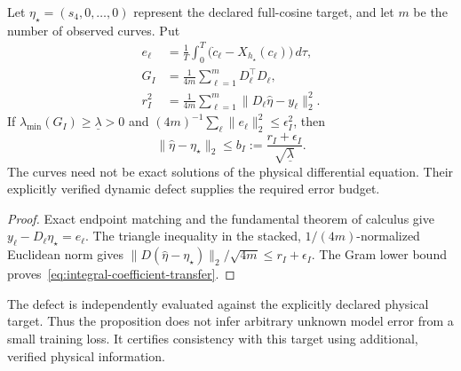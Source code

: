 \begin{proposition}
\label{prop:integral-transfer}
Let $\eta_\star=(s_4,0,\ldots,0)$ represent the declared full-cosine target,
and let $m$ be the number of observed curves. Put
\begin{equation}
 \begin{aligned}
 e_\ell&=\frac1T\int_0^T
       \bigl(\dot c_\ell-X_{h_\star}(c_\ell)\bigr)\,d\tau,\\
 G_I&=\frac1{4m}\sum_{\ell=1}^m D_\ell^\top D_\ell,\\
 r_I^2&=\frac1{4m}\sum_{\ell=1}^m
                   \|D_\ell\widehat\eta-y_\ell\|_2^2 .
 \end{aligned}
 \label{eq:integral-defect-gram}
\end{equation}
If $\lambda_{\min}(G_I)\geq\underline\lambda>0$ and
$(4m)^{-1}\sum_\ell\|e_\ell\|_2^2\leq\epsilon_I^2$, then
\begin{equation}
 \|\widehat\eta-\eta_\star\|_2
 \leq b_I:=\frac{r_I+\epsilon_I}{\sqrt{\underline\lambda}} .
 \label{eq:integral-coefficient-transfer}
\end{equation}
The curves need not be exact solutions of the physical differential
equation. Their explicitly verified dynamic defect supplies the required
error budget.
\end{proposition}

\begin{proof}
Exact endpoint matching and the fundamental theorem of calculus give
$y_\ell-D_\ell\eta_\star=e_\ell$.
The triangle inequality in the stacked, $1/(4m)$-normalized Euclidean
norm gives
$\|D(\widehat\eta-\eta_\star)\|_2/\sqrt{4m}\leq r_I+\epsilon_I$.
The Gram lower bound proves~\eqref{eq:integral-coefficient-transfer}.
\end{proof}

The defect is independently evaluated against the explicitly declared
physical target. Thus the proposition does not infer arbitrary unknown
model error from a small training loss. It certifies consistency with
this target using additional, verified physical information.

